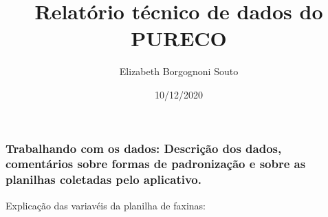 \documentclass[
]{article}
\title{Relatório técnico de dados do PURECO}
\author{Elizabeth Borgognoni Souto}
\date{10/12/2020}
\begin{document}
\maketitle

\hypertarget{trabalhando-com-os-dados-descriuxe7uxe3o-dos-dados-comentuxe1rios-sobre-formas-de-padronizauxe7uxe3o-e-sobre-as-planilhas-coletadas-pelo-aplicativo.}{%
\subsubsection{Trabalhando com os dados: Descrição dos dados,
comentários sobre formas de padronização e sobre as planilhas coletadas
pelo
aplicativo.}\label{trabalhando-com-os-dados-descriuxe7uxe3o-dos-dados-comentuxe1rios-sobre-formas-de-padronizauxe7uxe3o-e-sobre-as-planilhas-coletadas-pelo-aplicativo.}}

Explicação das variavéis da planilha de faxinas:
\end{document}
